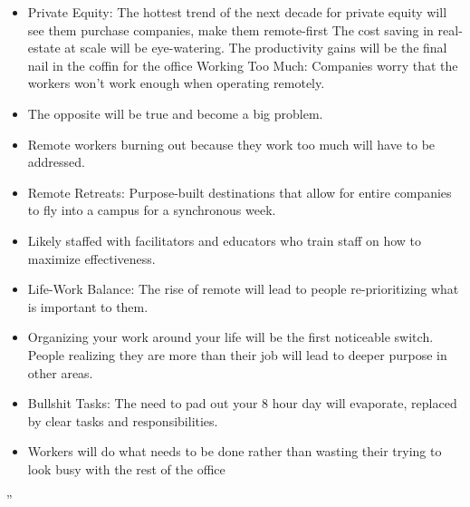 {\begin{itemize}
\item Private Equity: The hottest trend of the next decade for private equity will see them purchase companies, make them remote-first
The cost saving in real-estate at scale will be eye-watering. The productivity gains will be the final nail in the coffin for the office
Working Too Much: Companies worry that the workers won't work enough when operating remotely.
\item The opposite will be true and become a big problem.
\item Remote workers burning out because they work too much will have to be addressed.
\item Remote Retreats: Purpose-built destinations that allow for entire companies to fly into a campus for a synchronous week.
\item Likely staffed with facilitators and educators who train staff on how to maximize effectiveness.
\item Life-Work Balance: The rise of remote will lead to people re-prioritizing what is important to them.
\item Organizing your work around your life will be the first noticeable switch. People realizing they are more than their job will lead to deeper purpose in other areas.
\item Bullshit Tasks: The need to pad out your 8 hour day will evaporate, replaced by clear tasks and responsibilities.
\item Workers will do what needs to be done rather than wasting their trying to look busy with the rest of the office
\end{itemize}
''}

